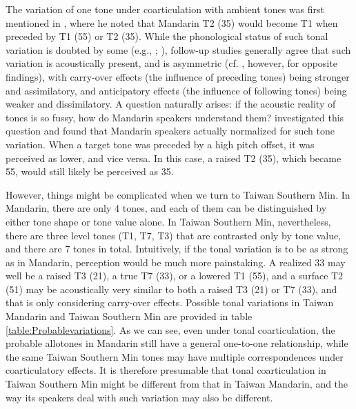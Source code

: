 \documentclass[12pt]{report}
\begin{document}
\begin{CJK}{UTF8}{bsmi}
The variation of one tone under coarticulation with ambient tones was first mentioned in \cite{Chao1968}, where he noted that Mandarin T2 (35) would become T1 when preceded by T1 (55) or T2 (35). While the phonological status of such tonal variation is doubted by some (e.g., \citealp{ShihSproat1992}; \citealp{Xu1994}), follow-up studies generally agree that such variation is acoustically present, and is asymmetric (cf. \citealp{Shen1990}, however, for opposite findings), with carry-over effects (the influence of preceding tones) being stronger and assimilatory, and anticipatory effects (the influence of following tones) being weaker and dissimilatory. A question naturally arises: if the acoustic reality of tones is so fussy, how do Mandarin speakers understand them? \cite{Xu1997} investigated this question and found that Mandarin speakers actually normalized for such tone variation. When a target tone was preceded by a high pitch offset, it was perceived as lower, and vice versa. In this case, a raised T2 (35), which became 55, would still likely be perceived as 35.

However, things might be complicated when we turn to Taiwan Southern Min. In Mandarin, there are only 4 tones, and each of them can be distinguished by either tone shape or tone value alone. In Taiwan Southern Min, nevertheless, there are three level tones (T1, T7, T3) that are contrasted only by tone value, and there are 7 tones in total. Intuitively, if the tonal variation is to be as strong as in Mandarin, perception would be much more painstaking. A realized 33 may well be a raised T3 (21), a true T7 (33), or a lowered T1 (55), and a surface T2 (51) may be acoustically very similar to both a raised T3 (21) or T7 (33), and that is only considering carry-over effects. Possible tonal variations in Taiwan Mandarin and Taiwan Southern Min are provided in table \ref{table:Probablevariations}. As we can see, even under tonal coarticulation, the probable allotones in Mandarin still have a general one-to-one relationship, while the same Taiwan Southern Min tones may have multiple correspondences under coarticulatory effects. It is therefore presumable that tonal coarticulation in Taiwan Southern Min might be different from that in Taiwan Mandarin, and the way its speakers deal with such variation may also be different.


\end{CJK}
\end{document}
